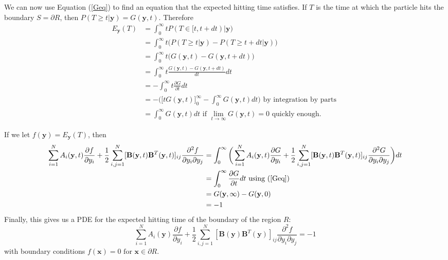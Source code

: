 \documentclass{article}
\newcommand{\mb}{\mathbf}
\begin{document}
We can now use Equation (\ref{Geq}) to find an equation that the expected hitting time satisfies. If $T$ is the time at which the particle hits the boundary $S=\partial R$, then $P(T\geq t|{\mb y})=G({\mathbf y},t)$.  Therefore
\begin{align*}
E_{{\mathbf y}}(T) &=\int_0^\infty t P(T\in[t,t+dt)|{\mathbf y})
\\&= \int_0^\infty t \bigg(P(T\geq t|{\mathbf y})-P(T\geq t+dt|{\mathbf y})\bigg) 
\\&=\int_0^\infty t \bigg(G({\mathbf y},t)-G({\mathbf y},t+dt)\bigg)
\\&=\int_0^\infty t \frac{G({\mathbf y},t)-G({\mathbf y},t+dt)}{dt}dt
\\&=-\int_0^\infty t\frac{\partial G}{\partial t}dt
\\&=-\bigg(\big[tG({\mathbf y},t)\big]_0^{\infty}-\int_0^\infty G({\mathbf y},t)dt\bigg)  \text{ by integration by parts }
\\&=\int_0^\infty G({\mathbf y},t)dt \text{ if $\lim_{t\to \infty}G({\mathbf y},t)=0$ quickly enough}.
\end{align*}

If we let $f({\mathbf y})=E_{\mathbf y}(T)$, then 
\begin{align*}
\sum_{i=1}^NA_i({\mb y},t)\frac{\partial f}{\partial y_i}+\frac{1}{2}\sum_{i,j=1}^N[{\mb B}({\mb y},t){\mb B}^T({\mb y},t)]_{ij}\frac{\partial^2 f}{\partial y_i\partial y_j}&=\int_0^\infty\bigg(\sum_{i=1}^NA_i({\mb y},t)\frac{\partial G}{\partial y_i}+\frac{1}{2}\sum_{i,j=1}^N[{\mb B}({\mb y},t){\mb B}^T({\mb y},t)]_{ij}\frac{\partial^2 G}{\partial y_i\partial y_j}\bigg)dt
\\&=\int_0^\infty\frac{\partial G}{\partial t}dt \text{ using (\ref{Geq})}
\\&=G({\mb y},\infty)-G({\mb y},0)
\\&=-1
\end{align*}
Finally, this gives us a PDE for the expected hitting time of the boundary of the region $R$:
\begin{equation}
\sum_{i=1}^NA_i({\mb y})\frac{\partial f}{\partial y_i}+\frac{1}{2}\sum_{i,j=1}^N[{\mb B}({\mb y}){\mb B}^T({\mb y})]_{ij}\frac{\partial^2 f}{\partial y_i\partial y_j}=-1 \label{DT}
\end{equation}
with boundary conditions $f({\mb x})=0 \text{ for } {\mb x}\in\partial R$.
\end{document}
